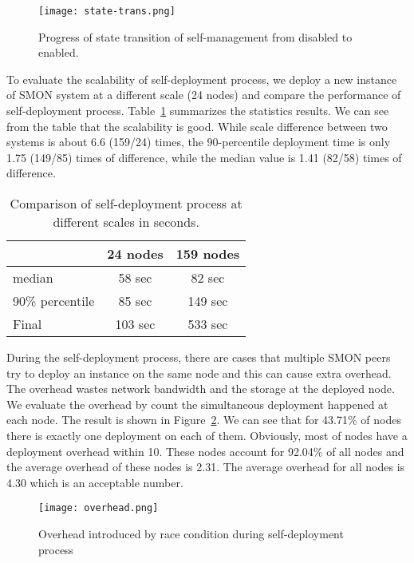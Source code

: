 \begin{figure}
\centering
\texttt{[image: state-trans.png]}
\caption{Progress of state transition of self-management from disabled to
enabled.}
\label{fig:state-transition}
\end{figure}


To evaluate the scalability of self-deployment process, we deploy
a new instance of SMON system at a different scale (24 nodes) and
compare the performance of self-deployment process.
Table~\ref{tbl:scalability} summarizes the statistics results.
We can see from the table that the scalability is good.
While scale difference between two systems is about 6.6
(159/24) times, the
90-percentile deployment time is only 1.75 (149/85) times of
difference, while the median value is 1.41 (82/58) times of
difference.

\begin{table}
\centering
\begin{tabular}{|l|c|c|}
\hline
  & 24 nodes & 159 nodes\\
\hline
median & 58 sec & 82 sec \\
\hline
90\% percentile & 85 sec & 149 sec\\
\hline
Final & 103 sec & 533 sec\\
\hline
\end{tabular}
\caption{Comparison of self-deployment process at different
scales in seconds.}
\label{tbl:scalability}
\end{table}

During the self-deployment process, there are cases that
multiple SMON peers try to deploy an instance on the same
node and this can cause extra overhead. The overhead wastes
network bandwidth and the storage at the deployed node. We
evaluate the overhead by count the simultaneous deployment
happened at each node. The result is shown in
Figure~\ref{fig:overhead}. We can see that for 43.71\% of
nodes there is exactly one deployment on each of them.
Obviously, most of nodes have a deployment overhead within
10. These nodes account for 92.04\% of all nodes and the
average overhead of these nodes is 2.31. The average
overhead for all nodes is 4.30 which is an acceptable
number.

\begin{figure}
\centering
\texttt{[image: overhead.png]}
\caption{Overhead introduced by race condition during
self-deployment process}
\label{fig:overhead}
\end{figure}


